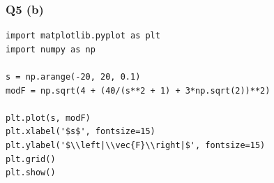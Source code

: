 \documentclass[12pt]{article}
\begin{document}
\subsubsection*{Q5 (b)}
\begin{verbatim}
import matplotlib.pyplot as plt
import numpy as np

s = np.arange(-20, 20, 0.1)
modF = np.sqrt(4 + (40/(s**2 + 1) + 3*np.sqrt(2))**2)

plt.plot(s, modF)
plt.xlabel('$s$', fontsize=15)
plt.ylabel('$\\left|\\vec{F}\\right|$', fontsize=15)
plt.grid()
plt.show()
\end{verbatim}
\end{document}
